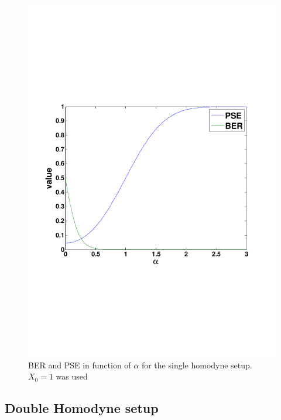 \begin{figure}[h]
\centering
\includegraphics[width=\linewidth, trim= 0mm 60mm 0mm 70mm]{./sdf/cv_system/figures/singlehomodyne.pdf}
\caption{BER and PSE in function of $\alpha$ for the single homodyne setup. $X_0=1$ was used}
\label{fig:ber}
\end{figure}



\subsection{Double Homodyne setup}

